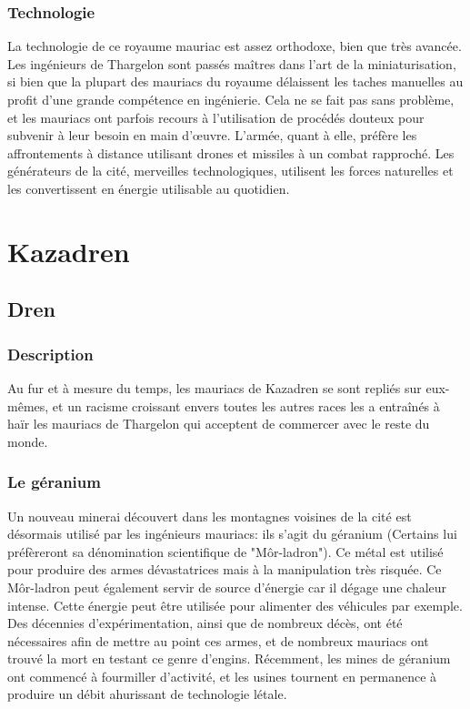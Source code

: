 \subsubsection{Technologie}
La technologie de ce royaume mauriac est assez orthodoxe, bien que très avancée. Les ingénieurs de Thargelon sont passés maîtres dans l'art de la miniaturisation, si bien que la plupart des mauriacs du royaume délaissent les taches manuelles au profit d'une grande compétence en ingénierie. Cela ne se fait pas sans problème, et les mauriacs ont parfois recours à l'utilisation de procédés douteux pour subvenir à leur besoin en main d’œuvre. L'armée, quant à elle, préfère les affrontements à distance utilisant drones et missiles à un combat rapproché. Les générateurs de la cité, merveilles technologiques, utilisent les forces naturelles et les convertissent en énergie utilisable au quotidien.
\section{Kazadren}
\subsection{Dren}
\subsubsection{Description}
Au fur et à mesure du temps, les mauriacs de Kazadren se sont repliés sur eux-mêmes, et un racisme croissant envers toutes les autres races les a entraînés à haïr les mauriacs de Thargelon qui acceptent de commercer avec le reste du monde.
\subsubsection{Le géranium}
Un nouveau minerai découvert dans les montagnes voisines de la cité est désormais utilisé par les ingénieurs mauriacs: ils s'agit du géranium (Certains lui préfèreront sa dénomination scientifique de "Môr-ladron"). Ce métal est utilisé pour produire des armes dévastatrices mais à la manipulation très risquée. Ce Môr-ladron peut également servir de source d'énergie car il dégage une chaleur intense. Cette énergie peut être utilisée pour alimenter des véhicules par exemple. Des décennies d'expérimentation, ainsi que de nombreux décès, ont été nécessaires afin de mettre au point ces armes, et de nombreux mauriacs ont trouvé la mort en testant ce genre d'engins. Récemment, les mines de géranium ont commencé à fourmiller d'activité, et les usines tournent en permanence à produire un débit ahurissant de technologie létale.

